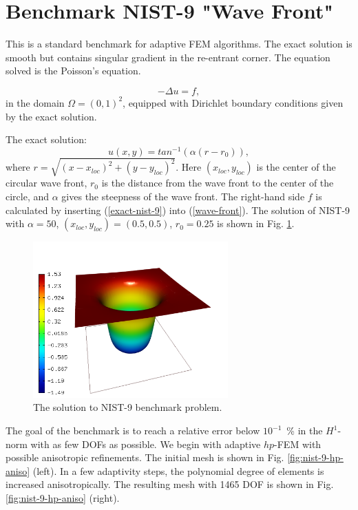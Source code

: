 \section{Benchmark NIST-9 "Wave Front"}
\label{sec:bench-9}

This is a standard benchmark for adaptive FEM algorithms. The exact solution is smooth but contains singular gradient in the re-entrant corner.
The equation solved is the Poisson's equation.

\begin{equation} \label{wave-front}
-\Delta u = f,
\end{equation}
in the domain $\Omega = (0, 1)^2$, equipped with Dirichlet boundary conditions
given by the exact solution.

The exact solution:
\begin{equation}\label{exact-nist-9}
u(x, y) = tan^{-1}(\alpha (r - r_{0})),
\end{equation}
where $r = \sqrt{(x - x_{loc})^{2} + (y - y_{loc})^{2}}$.
Here $(x_{loc}, y_{loc})$ is the center of the circular wave front,
$r_{0}$ is the distance from the wave front to the center of the circle,
and $\alpha$ gives the steepness of the wave front.
The right-hand side $f$ is calculated by inserting (\ref{exact-nist-9}) into (\ref{wave-front}).
The solution of NIST-9 with $\alpha = 50$, $(x_{loc}, y_{loc}) = (0.5, 0.5)$,
$r_{0} = 0.25$ is shown in Fig. \ref{fig:sln-nist09}.

\begin{figure}[!ht]
\centering
\includegraphics[height=6cm]{nist/nist-9/solution.png}
\caption{The solution to NIST-9 benchmark problem.}
\label{fig:sln-nist09}
\end{figure}

The goal of the benchmark is to reach a relative error below
$10^{-1}$~\% in the $H^1$-norm with as few DOFs as possible.
We begin with adaptive $hp$-FEM with possible anisotropic refinements.
The initial mesh is shown in Fig. \ref{fig:nist-9-hp-aniso} (left).
In a few adaptivity steps, the polynomial degree of elements is increased
anisotropically.
The resulting mesh with 1465 DOF is shown in Fig. \ref{fig:nist-9-hp-aniso} (right).

